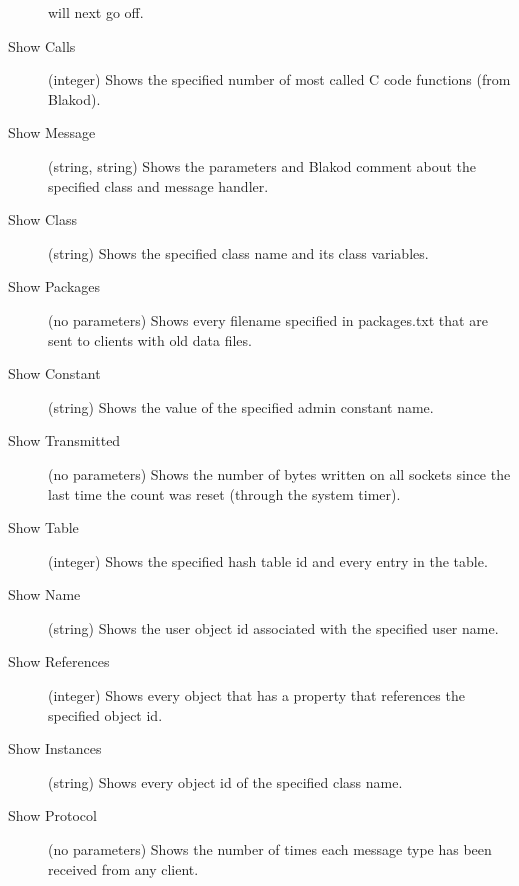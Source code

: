 \begin{description}
will next go off.
\item[Show Calls] (integer) Shows the specified number of most called C code functions
(from Blakod).
\item[Show Message] (string, string) Shows the parameters and Blakod comment about
the specified class and message handler.
\item[Show Class] (string) Shows the specified class name and its class variables.
\item[Show Packages] (no parameters) Shows every filename specified in packages.txt
that are sent to clients with old data files.
\item[Show Constant] (string) Shows the value of the specified admin constant name.
\item[Show Transmitted] (no parameters) Shows the number of bytes written on all sockets
since the last time the count was reset (through the system timer).
\item[Show Table] (integer) Shows the specified hash table id and every entry in the table.
\item[Show Name] (string) Shows the user object id associated with the specified user name.
\item[Show References] (integer) Shows every object that has a property that references
the specified object id.
\item[Show Instances] (string) Shows every object id of the specified class name.
\item[Show Protocol] (no parameters) Shows the number of times each message type has
been received from any client.

\end{description}

